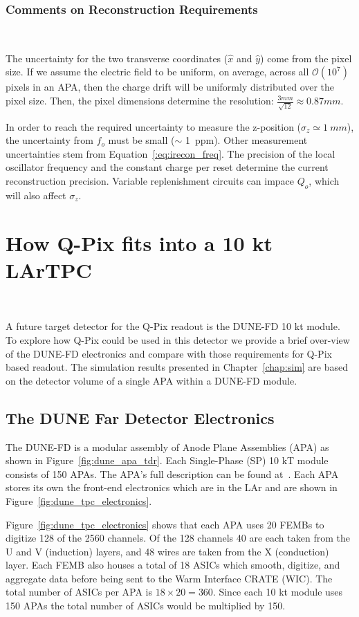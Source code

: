 \subsubsection{Comments on Reconstruction Requirements}~\label{sec:recon_uncert}

The uncertainty for the two transverse coordinates ($\hat{x}$ and $\hat{y}$) come from the pixel size.
If we assume the electric field to be uniform, on average, across all $\mathcal{O}(10^{7})$ pixels in an APA, then the charge drift will be uniformly distributed over the pixel size.
Then, the pixel dimensions determine the resolution: $\frac{3 mm}{\sqrt{12}} \approx 0.87 mm$.

In order to reach the required uncertainty to measure the z-position ($\sigma_{z} \simeq 1~\unit{mm}$), the uncertainty from $f_{o}$ must be small ($\sim$ 1~\unit{ppm}).
Other measurement uncertainties stem from Equation~\ref{:eq:irecon_freq}.
The precision of the local oscillator frequency and the constant charge per reset determine the current reconstruction precision.
Variable replenishment circuits can impace $Q_{o}$, which will also affect $\sigma_{z}$.

\section{How Q-Pix fits into a 10 kt LArTPC}~\label{sec:qpix_apa}

A future target detector for the Q-Pix readout is the DUNE-FD 10 kt module.
To explore how Q-Pix could be used in this detector we provide a brief over-view of the DUNE-FD electronics and compare with those requirements for Q-Pix based readout.
The simulation results presented in Chapter~\ref{chap:sim} are based on the detector volume of a single APA within a DUNE-FD module.

\subsection{The DUNE Far Detector Electronics}

The DUNE-FD is a modular assembly of Anode Plane Assemblies (APA) as shown in Figure~\ref{fig:dune_apa_tdr}.
Each Single-Phase (SP) 10 kT module consists of 150 APAs.
The APA's full description can be found at~\citep{DUNE-FD_TDRv4:Abi_2020}.
Each APA stores its own the front-end electronics which are in the LAr and are shown in Figure~\ref{fig:dune_tpc_electronics}.

Figure~\ref{fig:dune_tpc_electronics} shows that each APA uses 20 FEMBs to digitize 128 of the 2560 channels.
Of the 128 channels 40 are each taken from the U and V (induction) layers, and 48 wires are taken from the X (conduction) layer.
Each FEMB also houses a total of 18 ASICs which smooth, digitize, and aggregate data before being sent to the Warm Interface CRATE (WIC).
The total number of ASICs per APA is $18\times 20 = 360$.
Since each 10 kt module uses 150 APAs the total number of ASICs would be multiplied by 150.


